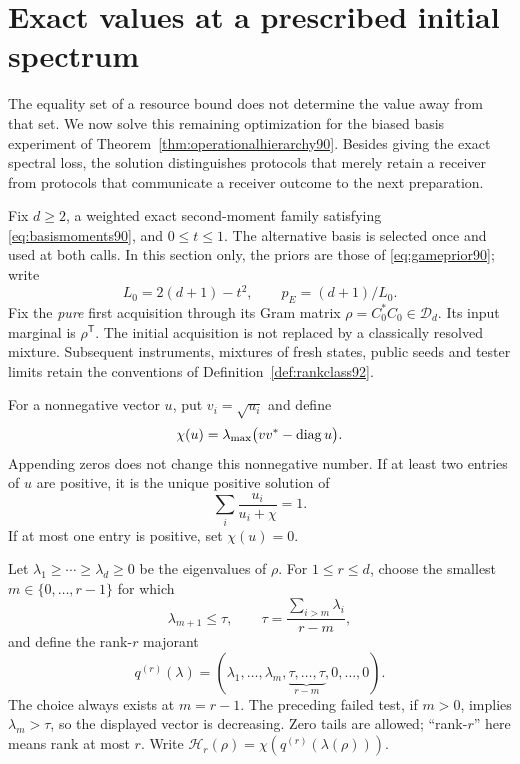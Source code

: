 \section{Exact values at a prescribed initial spectrum}
\label{sec:spectralvalue94}
The equality set of a resource bound does not determine the value away
from that set.  We now solve this remaining optimization for the biased
basis experiment of Theorem~\ref{thm:operationalhierarchy90}.  Besides
giving the exact spectral loss, the solution distinguishes protocols
that merely retain a receiver from protocols that communicate a
receiver outcome to the next preparation.

Fix $d\ge2$, a weighted exact second-moment family satisfying
\eqref{eq:basismoments90}, and $0\le t\le1$.  The alternative basis is
selected once and used at both calls.  In this section only, the priors
are those of \eqref{eq:gameprior90}; write
\[
 L_0=2(d+1)-t^2,\qquad p_E=(d+1)/L_0.
\]
Fix the \emph{pure} first acquisition through its Gram matrix
$\rho=C_0^*C_0\in\mathcal D_d$.  Its input marginal is
$\rho^{\mathsf T}$.  The initial acquisition is not replaced by a
classically resolved mixture.  Subsequent instruments, mixtures of
fresh states, public seeds and tester limits retain the conventions of
Definition~\ref{def:rankclass92}.

For a nonnegative vector $u$, put $v_i=\sqrt{u_i}$ and define
\begin{equation}\label{eq:secularmatrix94}
 \chi(u)=\lambda_{\max}\bigl(vv^*-\operatorname{diag} u\bigr).
\end{equation}
Appending zeros does not change this nonnegative number.  If at least
two entries of $u$ are positive, it is the unique positive solution of
\begin{equation}\label{eq:secularroot94}
                 \sum_i\frac{u_i}{u_i+\chi}=1.
\end{equation}
If at most one entry is positive, set $\chi(u)=0$.

Let $\lambda_1\ge\cdots\ge\lambda_d\ge0$ be the eigenvalues of
$\rho$.  For $1\le r\le d$, choose the smallest
$m\in\{0,\ldots,r-1\}$ for which
\[
 \lambda_{m+1}\le\tau,\qquad
 \tau=\frac{\sum_{i>m}\lambda_i}{r-m},
\]
and define the rank-$r$ majorant
\begin{equation}\label{eq:rankmajorant94}
 q^{(r)}(\lambda)
   =(\lambda_1,\ldots,\lambda_m,
               \underbrace{\tau,\ldots,\tau}_{r-m},0,\ldots,0).
\end{equation}
The choice always exists at $m=r-1$.  The preceding failed test, if
$m>0$, implies $\lambda_m>\tau$, so the displayed vector is decreasing.
Zero tails are allowed; ``rank-$r$'' here means rank at most $r$.
Write $\mathcal H_r(\rho)=\chi(q^{(r)}(\lambda(\rho)))$.

